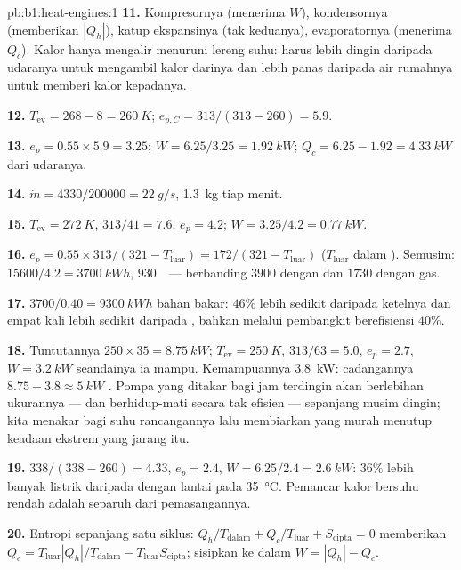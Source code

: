 \begin{solution}{pb:b1:heat-engines:1}
\textbf{11.} Kompresornya (menerima $W$), kondensornya (memberikan $|Q_h|$),
katup ekspansinya (tak keduanya), evaporatornya (menerima $Q_c$). Kalor hanya mengalir
menuruni lereng suhu:  harus lebih dingin daripada udaranya untuk
mengambil kalor darinya dan lebih panas daripada air rumahnya untuk memberi kalor kepadanya.

\textbf{12.} $T_{\mathrm{ev}} = 268 - 8 = \qty{260}{K}$; $e_{p,C} = 313/(313 - 260)
= 5.9$.

\textbf{13.} $e_p = 0.55 \times 5.9 = 3.25$; $W = 6.25/3.25 = \qty{1.92}{kW}$;
$Q_c = 6.25 - 1.92 = \qty{4.33}{kW}$ dari udaranya.

\textbf{14.} $\dot m = 4330/200000 = \qty{22}{g/s}$, \qty{1.3}{kg} tiap menit.

\textbf{15.} $T_{\mathrm{ev}} = \qty{272}{K}$, $313/41 = 7.6$, $e_p = 4.2$;
$W = 3.25/4.2 = \qty{0.77}{kW}$.

\textbf{16.} $e_p = 0.55 \times 313/(321 - T_{\mathrm{luar}}) = 172/(321 -
T_{\mathrm{luar}})$ ($T_{\mathrm{luar}}$ dalam ). Semusim: $15600/4.2 =
\qty{3700}{kW h}$, $930$~\texteuro\ --- berbanding $3900$ dengan  dan
$1730$ dengan gas.

\textbf{17.} $3700/0.40 = \qty{9300}{kW h}$ bahan bakar: $46\%$ lebih sedikit daripada
ketelnya dan empat kali lebih sedikit daripada , bahkan melalui pembangkit
berefisiensi $40\%$.

\textbf{18.} Tuntutannya $250 \times 35 = \qty{8.75}{kW}$; $T_{\mathrm{ev}} = \qty{250}{K}$,
$313/63 = 5.0$, $e_p = 2.7$, $W = \qty{3.2}{kW}$ seandainya ia mampu. Kemampuannya
\qty{3.8}{kW}: cadangannya $8.75 - 3.8 \approx \qty{5}{kW}$ . Pompa yang
ditakar bagi jam terdingin akan berlebihan ukurannya --- dan berhidup-mati
secara tak efisien --- sepanjang musim dingin; kita menakar bagi suhu rancangannya lalu
membiarkan  yang murah menutup keadaan ekstrem yang jarang itu.

\textbf{19.} $338/(338 - 260) = 4.33$, $e_p = 2.4$, $W = 6.25/2.4 =
\qty{2.6}{kW}$: $36\%$ lebih banyak listrik daripada dengan lantai pada
\qty{35}{\degreeCelsius}. Pemancar kalor bersuhu rendah adalah separuh dari
pemasangannya.

\textbf{20.} Entropi sepanjang satu siklus: $Q_h/T_{\mathrm{dalam}} + Q_c/T_{\mathrm{luar}} +
S_{\mathrm{cipta}} = 0$ memberikan $Q_c = T_{\mathrm{luar}}|Q_h|/T_{\mathrm{dalam}} -
T_{\mathrm{luar}}S_{\mathrm{cipta}}$; sisipkan ke dalam $W = |Q_h| - Q_c$.


\end{solution}
